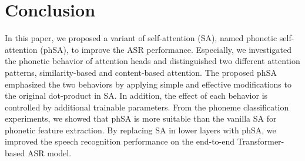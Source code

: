 \section{Conclusion}\label{sec:conclusion}

In this paper, we proposed a variant of self-attention (SA), named phonetic self-attention (phSA), to improve the ASR performance.
Especially, we investigated the phonetic behavior of attention heads and distinguished two different attention patterns, similarity-based and content-based attention.
The proposed phSA emphasized the two behaviors by applying simple and effective modifications to the original dot-product in SA.
In addition, the effect of each behavior is controlled by additional trainable parameters.
From the phoneme classification experiments, we showed that phSA is more suitable than the vanilla SA for phonetic feature extraction.
By replacing SA in lower layers with phSA, we improved the speech recognition performance on the end-to-end Transformer-based ASR model.
